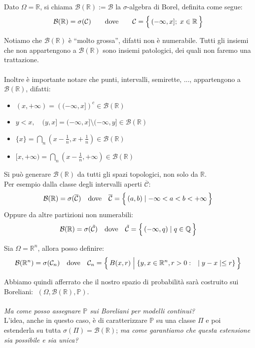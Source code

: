 \begin{definizione}
    Dato $\Omega = \mathbb{R}$, si chiama $\mathcal{B}(\mathbb{R}) :=\mathcal{B}$ la $\sigma$-algebra di Borel, definita come segue:
    \[\mathcal{B}(\mathbb{R}) = \sigma(\mathcal{C})\qquad\text{dove}\qquad \mathcal{C}=\Bigl\{\,(-\infty, x]; \; x\in\mathbb{R}\,\Bigr\}\]
\end{definizione}
\noindent
Notiamo che $\mathcal{B}(\mathbb{R})$ è ``molto grossa'', difatti non è numerabile. Tutti gli insiemi che non appartengono a $\mathcal{B}(\mathbb{R})$ sono insiemi patologici, dei quali non faremo una trattazione.\\
\\
Inoltre è importante notare che punti, intervalli, semirette, ..., appartengono a $\mathcal{B}(\mathbb{R})$, difatti:

\begin{itemize}
    \item $(x, +\infty) = \left((-\infty, x]\right)^c\in \mathcal{B}(\mathbb{R})$
    \item $y<x, \quad (y, x] = (-\infty, x] \setminus(-\infty, y] \in \mathcal{B}(\mathbb{R})$
    \item $\{x\} = \bigcap_n (x-\frac{1}{n}, x+\frac{1}{n}) \in \mathcal{B}(\mathbb{R})$
    \item $[x, +\infty) = \bigcap_n(x-\frac{1}{n}, +\infty) \in \mathcal{B}(\mathbb{R})$
\end{itemize}

\begin{teorema}
    Si può generare $\mathcal{B}(\mathbb{R})$ da tutti gli spazi topologici, non solo da $\mathbb{R}$. \\
    Per esempio dalla classe degli intervalli aperti $\mathcal{\overline{C}}$:
    \[\mathcal{B}(\mathbb{R}) = \sigma(\mathcal{\overline{C}})\quad \text{dove} \quad \mathcal{\overline{C}} = \Bigl\{\,(a, b)\mid -\infty<a<b<+\infty\,\Bigr\}\]
    Oppure da altre partizioni non numerabili:
    \[\mathcal{B}(\mathbb{R}) = \sigma(\mathcal{\tilde{C}})\quad \text{dove} \quad \mathcal{\tilde{C}} = \Bigl\{\,(-\infty, q)\mid q\in\mathbb{Q}\,\Bigr\}\]
\end{teorema}

\begin{definizione}
    Sia $\Omega = \mathbb{R}^n$, allora posso definire:
    \[\mathcal{B}(\mathbb{R}^n) = \sigma(\mathcal{C}_n) \quad\text{dove}\quad \mathcal{C}_n = \Bigl\{\,B(x, r)\;\Big{|}\; \{y, x\in\mathbb{R}^n, r>0:\quad \mid y-x\mid\leq r\}\,\Bigr\}\]
\end{definizione}
\bigskip
\noindent Abbiamo quindi afferrato che il nostro spazio di probabilità sarà costruito sui Boreliani: $\;(\Omega, \mathcal{B}(\mathbb{R}), \mathbb{P})$. \\
\\
\textit{Ma come posso assegnare $\mathbb{P}$ sui Boreliani per modelli continui?}\\
L'idea, anche in questo caso, è di caratterizzare $\mathbb{P}$ su una classe $\Pi$ e poi estenderla su tutta $\sigma(\Pi) = \mathcal{B}(\mathbb{R})$; \textit{ma come garantiamo che questa estensione sia possibile e sia unica?}

